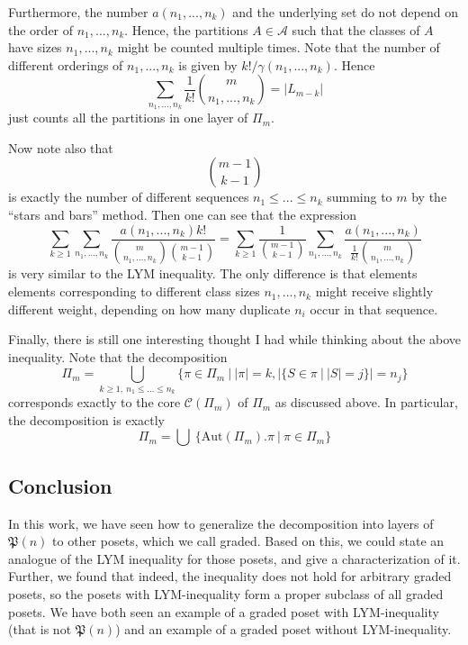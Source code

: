 \documentclass{scrartcl}
\newcommand{\powerset}{\mathfrak{P}}
\theoremstyle{definition}
\begin{document}
Furthermore, the number $a(n_1, ..., n_k)$ and the underlying set do not depend on the order of $n_1, ..., n_k$.
Hence, the partitions $A \in \mathcal{A}$ such that the classes of $A$ have sizes $n_1, ..., n_k$ might be counted multiple times.
Note that the number of different orderings of $n_1, ..., n_k$ is given by $k!/\gamma(n_1, ..., n_k)$.
Hence
\begin{equation*}
    \sum_{n_1, ..., n_k} \frac 1 {k!} {m \choose n_1, ..., n_k} = |L_{m - k}|
\end{equation*}
just counts all the partitions in one layer of $\Pi_m$.

Now note also that
\begin{equation*}
    {m - 1 \choose k - 1}
\end{equation*}
is exactly the number of different sequences $n_1 \leq ... \leq n_k$ summing to $m$ by the ``stars and bars'' method.
Then one can see that the expression
\begin{equation*}    
    \sum_{k \geq 1} \sum_{n_1, ..., n_k} \frac {a(n_1, ..., n_k) k!} {{m \choose n_1, ..., n_k} {m - 1 \choose k - 1}} = \sum_{k \geq 1} \frac 1 {{m - 1 \choose k - 1}} \sum_{n_1, ..., n_k} \frac {a(n_1, ..., n_k)} {\frac 1 {k!} {m \choose n_1, ..., n_k}}
\end{equation*}
is very similar to the LYM inequality.
The only difference is that elements elements corresponding to different class sizes $n_1, ..., n_k$ might receive slightly different weight, depending on how many duplicate $n_i$ occur in that sequence.

Finally, there is still one interesting thought I had while thinking about the above inequality.
Note that the decomposition
\begin{equation*}
    \Pi_m = \bigcup_{k \geq 1, \ n_1 \leq ... \leq n_k} \{ \pi \in \Pi_m \ | \ |\pi| = k, |\{ S \in \pi \ | \ |S| = j \}| = n_j \}
\end{equation*}
corresponds exactly to the core $\mathcal{C}(\Pi_m)$ of $\Pi_m$ as discussed above.
In particular, the decomposition is exactly
\begin{equation*}
    \Pi_m = \bigcup \ \{ \mathrm{Aut}(\Pi_m).\pi \ | \ \pi \in \Pi_m \}
\end{equation*}

\subsection*{Conclusion}
In this work, we have seen how to generalize the decomposition into layers of $\powerset(n)$ to other posets, which we call graded.
Based on this, we could state an analogue of the LYM inequality for those posets, and give a characterization of it.
Further, we found that indeed, the inequality does not hold for arbitrary graded posets, so the posets with LYM-inequality form a proper subclass of all graded posets.
We have both seen an example of a graded poset with LYM-inequality (that is not $\powerset(n)$) and an example of a graded poset without LYM-inequality.
\end{document}
